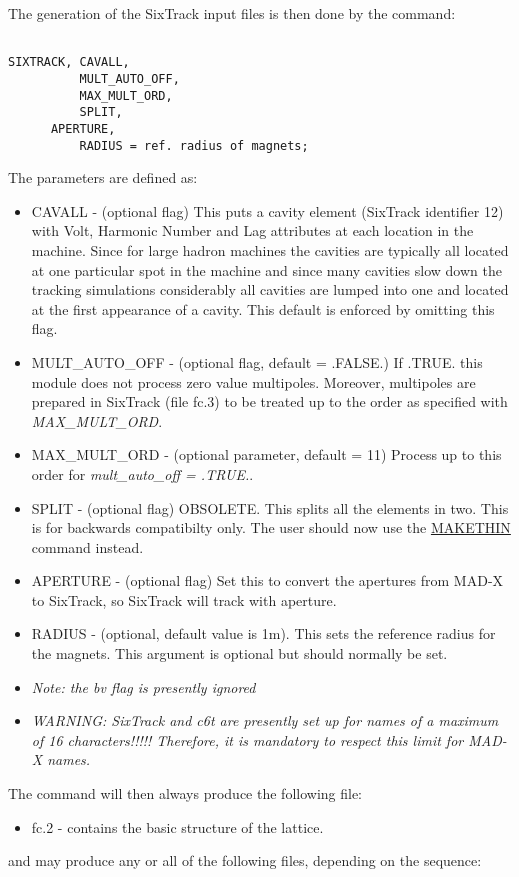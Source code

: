   The generation of the SixTrack input files is then done by the command: 
\begin{verbatim}

SIXTRACK, CAVALL,
          MULT_AUTO_OFF,
          MAX_MULT_ORD,
          SPLIT,
	  APERTURE,
          RADIUS = ref. radius of magnets;
\end{verbatim} The parameters are defined as: 
\begin{itemize}
	\item  CAVALL - (optional flag) This puts a cavity element (SixTrack identifier 12) with Volt, Harmonic Number and Lag attributes at each location in the machine. Since for large hadron machines the cavities are typically all located at one particular spot in the machine and since many cavities slow down the tracking simulations considerably all cavities are lumped into one and located at the first appearance of a cavity. This default is enforced by omitting this flag. 
	\item  MULT\_AUTO\_OFF - (optional flag, default = .FALSE.) If .TRUE. this module does not process zero value multipoles. Moreover, multipoles are prepared in SixTrack (file fc.3) to be treated up to the order as specified with \textit{MAX\_MULT\_ORD}. 
	\item  MAX\_MULT\_ORD - (optional parameter, default = 11) Process up to this order for \textit{ mult\_auto\_off = .TRUE.}. 
	\item  SPLIT  - (optional flag) OBSOLETE. This splits all the elements in  two. This is for backwards compatibilty only. The user should now use the  \href{../makethin/makethin.html}{MAKETHIN} command instead. 
	\item  APERTURE - (optional flag) Set this to convert the apertures from MAD-X to SixTrack, so SixTrack will track with aperture. 
	\item  RADIUS - (optional, default value is 1m). This sets the reference  radius for the magnets. This argument is optional but should normally  be set. 
	\item \textit{ Note: the bv flag is presently ignored}
	\item \textit{ WARNING: SixTrack and c6t are presently set up for names of a maximum of 16 characters!!!!! Therefore, it is mandatory to respect this limit for MAD-X names.}
\end{itemize}  The command will then always produce the following file: 
\begin{itemize}
	\item  fc.2 - contains the basic structure of the lattice. 
\end{itemize} and may produce any or all of the following files, depending on  the sequence: 

